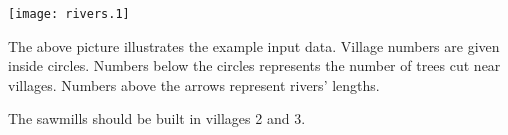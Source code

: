 \texttt{[image: rivers.1]}

The above picture illustrates the example input data. Village numbers are given inside circles. Numbers
below the circles represents the number of trees cut near villages. Numbers above the arrows represent
rivers' lengths.

The sawmills should be built in villages 2 and 3.
